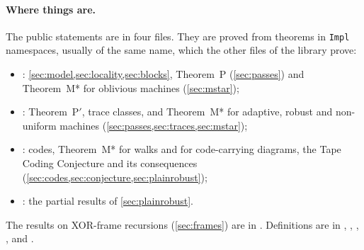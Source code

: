 \paragraph{Where things are.} The public statements are in four files. They are proved from theorems in \texttt{Impl}
namespaces, usually of the same name, which the other files of the library prove:
\begin{itemize}[leftmargin=2em]
\item {}: \cref{sec:model,sec:locality,sec:blocks}, Theorem~P (\cref{sec:passes}) and
Theorem~M* for oblivious machines (\cref{sec:mstar});
\item {}: Theorem~P$'$, trace classes, and Theorem~M* for adaptive, robust and
non-uniform machines (\cref{sec:passes,sec:traces,sec:mstar});
\item {}: codes, Theorem~M* for walks and for code-carrying diagrams, the Tape
Coding Conjecture and its consequences
(\cref{sec:codes,sec:conjecture,sec:plainrobust});
\item {}: the partial results of \cref{sec:plainrobust}.
\end{itemize}
The results on XOR-frame recursions (\cref{sec:frames}) are in . Definitions are in
, , , ,
 and .
